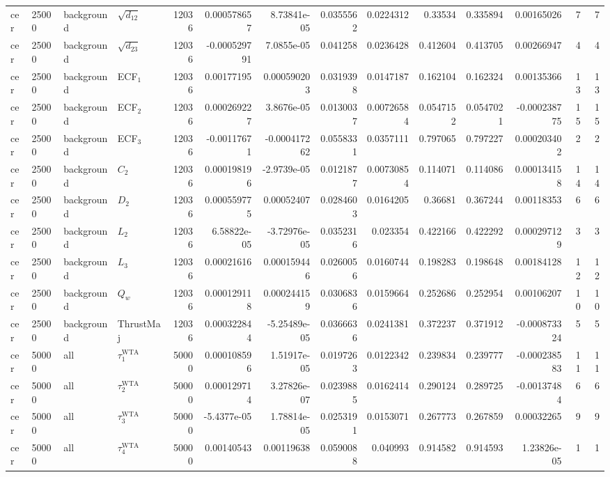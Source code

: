\begin{landscape}
\begin{longtable}{llll r rrrr rr r rr}
cer & 25000 & background & $\sqrt{d_{12}}$ & 12036 & 0.000578657 & 8.73841e-05 & 0.0355562 & 0.0224312 & 0.33534 & 0.335894 & 0.00165026 & 7 & 7 \\
cer & 25000 & background & $\sqrt{d_{23}}$ & 12036 & -0.000529791 & 7.0855e-05 & 0.041258 & 0.0236428 & 0.412604 & 0.413705 & 0.00266947 & 4 & 4 \\
cer & 25000 & background & ECF$_1$ & 12036 & 0.00177195 & 0.000590203 & 0.0319398 & 0.0147187 & 0.162104 & 0.162324 & 0.00135366 & 13 & 13 \\
cer & 25000 & background & ECF$_2$ & 12036 & 0.000269227 & 3.8676e-05 & 0.0130037 & 0.00726584 & 0.0547152 & 0.0547021 & -0.000238775 & 15 & 15 \\
cer & 25000 & background & ECF$_3$ & 12036 & -0.00117671 & -0.000417262 & 0.0558331 & 0.0357111 & 0.797065 & 0.797227 & 0.000203402 & 2 & 2 \\
cer & 25000 & background & $C_2$ & 12036 & 0.000198196 & -2.9739e-05 & 0.0121877 & 0.00730854 & 0.114071 & 0.114086 & 0.000134158 & 14 & 14 \\
cer & 25000 & background & $D_2$ & 12036 & 0.000559775 & 0.00052407 & 0.0284603 & 0.0164205 & 0.36681 & 0.367244 & 0.00118353 & 6 & 6 \\
cer & 25000 & background & $L_2$ & 12036 & 6.58822e-05 & -3.72976e-05 & 0.0352316 & 0.023354 & 0.422166 & 0.422292 & 0.000297129 & 3 & 3 \\
cer & 25000 & background & $L_3$ & 12036 & 0.00021616 & 0.000159446 & 0.0260056 & 0.0160744 & 0.198283 & 0.198648 & 0.00184128 & 12 & 12 \\
cer & 25000 & background & $Q_w$ & 12036 & 0.000129118 & 0.000244159 & 0.0306836 & 0.0159664 & 0.252686 & 0.252954 & 0.00106207 & 10 & 10 \\
cer & 25000 & background & ThrustMaj & 12036 & 0.000322844 & -5.25489e-05 & 0.0366636 & 0.0241381 & 0.372237 & 0.371912 & -0.000873324 & 5 & 5 \\
cer & 50000 & all & $\tau_1^{\mathrm{WTA}}$ & 50000 & 0.000108596 & 1.51917e-05 & 0.0197263 & 0.0122342 & 0.239834 & 0.239777 & -0.000238583 & 11 & 11 \\
cer & 50000 & all & $\tau_2^{\mathrm{WTA}}$ & 50000 & 0.000129714 & 3.27826e-07 & 0.0239885 & 0.0162414 & 0.290124 & 0.289725 & -0.00137484 & 6 & 6 \\
cer & 50000 & all & $\tau_3^{\mathrm{WTA}}$ & 50000 & -5.4377e-05 & 1.78814e-05 & 0.0253191 & 0.0153071 & 0.267773 & 0.267859 & 0.00032265 & 9 & 9 \\
cer & 50000 & all & $\tau_4^{\mathrm{WTA}}$ & 50000 & 0.00140543 & 0.00119638 & 0.0590088 & 0.040993 & 0.914582 & 0.914593 & 1.23826e-05 & 1 & 1 \\

\end{longtable}
\end{landscape}
